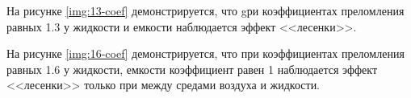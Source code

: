 \begin{figure}[ht!]
\end{figure}
\FloatBarrier

На рисунке \ref{img:13-coef} демонстрируется, что gри коэффициентах преломления равных 1.3 у жидкости и емкости наблюдается эффект <<лесенки>>.

\begin{figure}[ht!]
\end{figure}
\FloatBarrier

На рисунке \ref{img:16-coef} демонстрируется, что при коэффициентах преломления равных 1.6 у жидкости, емкости коэффициент равен 1 наблюдается эффект <<лесенки>> только при между средами воздуха и жидкости.

\begin{figure}[ht!]
\end{figure}
\FloatBarrier


